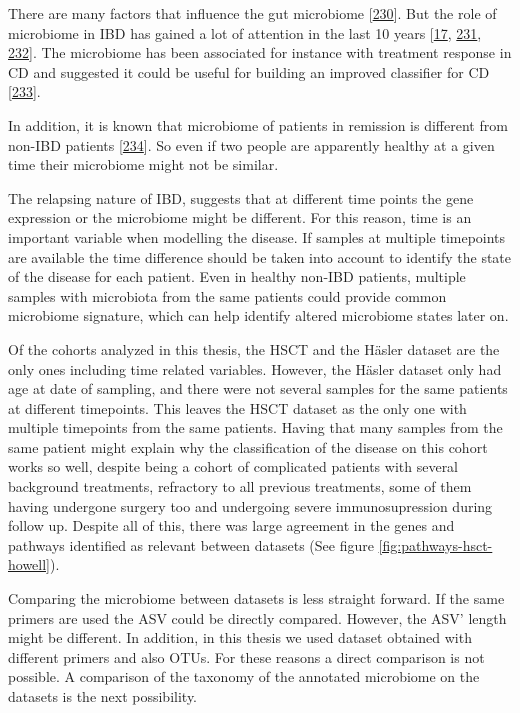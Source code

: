 \documentclass[
  12pt,
  a4paper,
  twoside,
  openright]{book}
\begin{document}
There are many factors that influence the gut microbiome {[}\protect\hyperlink{ref-hasan2019}{230}{]}.
But the role of microbiome in IBD has gained a lot of attention in the last 10 years {[}\protect\hyperlink{ref-khanna2014}{17}, \protect\hyperlink{ref-bringiotti2014}{231}, \protect\hyperlink{ref-lloyd-price2019}{232}{]}.
The microbiome has been associated for instance with treatment response in CD and suggested it could be useful for building an improved classifier for CD {[}\protect\hyperlink{ref-douglas2018}{233}{]}.

In addition, it is known that microbiome of patients in remission is different from non-IBD patients {[}\protect\hyperlink{ref-halfvarson2017}{234}{]}.
So even if two people are apparently healthy at a given time their microbiome might not be similar.

The relapsing nature of IBD, suggests that at different time points the gene expression or the microbiome might be different.
For this reason, time is an important variable when modelling the disease.
If samples at multiple timepoints are available the time difference should be taken into account to identify the state of the disease for each patient.
Even in healthy non-IBD patients, multiple samples with microbiota from the same patients could provide common microbiome signature, which can help identify altered microbiome states later on.

Of the cohorts analyzed in this thesis, the HSCT and the Häsler dataset are the only ones including time related variables.
However, the Häsler dataset only had age at date of sampling, and there were not several samples for the same patients at different timepoints.
This leaves the HSCT dataset as the only one with multiple timepoints from the same patients.
Having that many samples from the same patient might explain why the classification of the disease on this cohort works so well, despite being a cohort of complicated patients with several background treatments, refractory to all previous treatments, some of them having undergone surgery too and undergoing severe immunosupression during follow up.
Despite all of this, there was large agreement in the genes and pathways identified as relevant between datasets (See figure \ref{fig:pathways-hsct-howell}).

Comparing the microbiome between datasets is less straight forward.
If the same primers are used the ASV could be directly compared.
However, the ASV' length might be different.
In addition, in this thesis we used dataset obtained with different primers and also OTUs.
For these reasons a direct comparison is not possible.
A comparison of the taxonomy of the annotated microbiome on the datasets is the next possibility.
\end{document}
